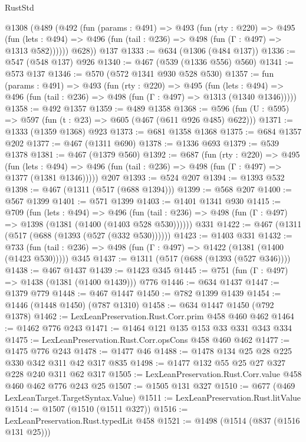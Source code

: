\begin{lexlean}{RustStd}
\begin{coremodule}
    @1308
      (@489
        (@492
          (fun (params : @491) =>
          @493
            (fun (rty : @220) =>
            @495
              (fun (lets : @494) =>
              @496 (fun (tail : @236) => @498 (fun (Γ : @497) => @1313 @582))))))
        @628))
    @137
@1333 := @634 (@1306 (@484 @137))
@1336 := @547 (@548 @137) @926
@1340 := @467 (@539 (@1336 @556) @560)
@1341 := @573 @137
@1346 := @570 (@572 @1341 @930 @528 @530)
@1357 := fun (params : @491) =>
  @493
    (fun (rty : @220) =>
    @495
      (fun (lets : @494) =>
      @496 (fun (tail : @236) => @498 (fun (Γ : @497) => @1313 (@1340 @1346)))))
@1358 := @492 @1357
@1359 := @489 @1358
@1368 := @596 (fun (U : @595) => @597 (fun (t : @23) => @605 (@467 (@611 @926 @485) @622)))
@1371 := @1333 (@1359 @1368) @923
@1373 := @681 @1358 @1368
@1375 := @684 @1357 @202
@1377 := @467 (@1311 @690)
@1378 := @1336 @693
@1379 := @539 @1378
@1381 := @467 (@1379 @560)
@1392 := @687
    (fun (rty : @220) =>
    @495
      (fun (lets : @494) =>
      @496 (fun (tail : @236) => @498 (fun (Γ : @497) => @1377 (@1381 @1346)))))
    @207
@1393 := @524 @207
@1394 := @1393 @532
@1398 := @467 (@1311 (@517 (@688 @1394)))
@1399 := @568 @207
@1400 := @567 @1399
@1401 := @571 @1399
@1403 := @1401 @1341 @930
@1415 := @709
    (fun (lets : @494) =>
    @496 (fun (tail : @236) => @498 (fun (Γ : @497) => @1398 (@1381 (@1400 (@1403 @528 @530))))))
    @331
@1422 := @467 (@1311 (@517 (@688 (@1393 (@527 (@332 @530))))))
@1423 := @1403 @331
@1432 := @733
    (fun (tail : @236) => @498 (fun (Γ : @497) => @1422 (@1381 (@1400 (@1423 @530)))))
    @345
@1437 := @1311 (@517 (@688 (@1393 (@527 @346))))
@1438 := @467 @1437
@1439 := @1423 @345
@1445 := @751 (fun (Γ : @497) => @1438 (@1381 (@1400 @1439))) @776
@1446 := @634 @1437
@1447 := @1379 @779
@1448 := @467 @1447
@1450 := @782 @1399 @1439
@1454 := @1446 (@1448 @1450) (@787 @1310)
@1458 := @634 @1447 @1450 (@792 @1378)
@1462 := LexLeanPreservation.Rust.Corr.prim @458 @460 @462
@1464 := @1462 @776 @243
@1471 := @1464 @121 @135 @153 @33 @331 @343 @334
@1475 := LexLeanPreservation.Rust.Corr.opsCons @458 @460 @462
@1477 := @1475 @776 @243
@1478 := @1477 @46
@1488 := @1478 @134 @25 @28 @225 @330 @342 @311 @42 @317 @835
@1498 := @1477 @132 @55 @25 @27 @327 @228 @240 @311 @62 @317
@1505 := LexLeanPreservation.Rust.Corr.value @458 @460 @462 @776 @243 @25
@1507 := @1505 @131 @327
@1510 := @677 (@469 LexLeanTarget.TargetSyntax.Value)
@1511 := LexLeanPreservation.Rust.litValue
@1514 := @1507 (@1510 (@1511 @327))
@1516 := LexLeanPreservation.Rust.typedLit @458
@1521 := @1498 (@1514 (@837 (@1516 @131 @25)))

\end{coremodule}
\end{lexlean}
